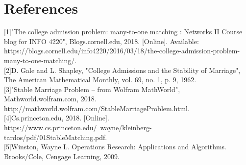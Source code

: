 \documentclass[twoside,twocolumn]{article}
\begin{document}
    \section{References}
    [1]"The college admission problem: many-to-one matching : Networks II Course blog for INFO 4220", Blogs.cornell.edu, 2018. [Online]. 
    Available: https://blogs.cornell.edu/info4220/2016/03/18/the-college-admission-problem-many-to-one-matching/. \\

    [2]D. Gale and L. Shapley, "College Admissions and the Stability of Marriage", The American Mathematical Monthly, vol. 69, no. 1, p. 9, 1962. \\
    
    [3]"Stable Marriage Problem -- from Wolfram MathWorld", Mathworld.wolfram.com, 2018. http://mathworld.wolfram.com/StableMarriageProblem.html. \\
    
    [4]Cs.princeton.edu, 2018. [Online]. https://www.cs.princeton.edu/~wayne/kleinberg-tardos/pdf/01StableMatching.pdf. \\

    [5]Winston, Wayne L. Operations Research: Applications and Algorithms. Brooks/Cole, Cengage Learning, 2009.
    
\end{document}
